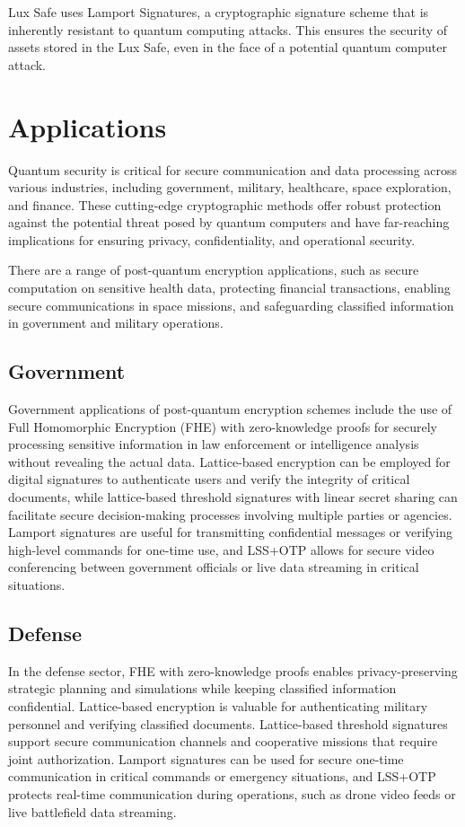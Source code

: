 \documentclass[11pt]{article}
\begin{document}
Lux Safe uses Lamport Signatures, a cryptographic signature scheme that is inherently resistant to quantum computing attacks. This ensures the security of assets stored in the Lux Safe, even in the face of a potential quantum computer attack.


\section{Applications}

Quantum security is critical for secure communication and data processing across various industries, including government, military, healthcare, space exploration, and finance. These cutting-edge cryptographic methods offer robust protection against the potential threat posed by quantum computers and have far-reaching implications for ensuring privacy, confidentiality, and operational security.


There are a range of post-quantum encryption applications, such as secure computation on sensitive health data, protecting financial transactions, enabling secure communications in space missions, and safeguarding classified information in government and military operations.


\subsection{Government}

Government applications of post-quantum encryption schemes include the use of Full Homomorphic Encryption (FHE) with zero-knowledge proofs for securely processing sensitive information in law enforcement or intelligence analysis without revealing the actual data. Lattice-based encryption can be employed for digital signatures to authenticate users and verify the integrity of critical documents, while lattice-based threshold signatures with linear secret sharing can facilitate secure decision-making processes involving multiple parties or agencies. Lamport signatures are useful for transmitting confidential messages or verifying high-level commands for one-time use, and LSS+OTP allows for secure video conferencing between government officials or live data streaming in critical situations.


\subsection{Defense}

In the defense sector, FHE with zero-knowledge proofs enables privacy-preserving strategic planning and simulations while keeping classified information confidential. Lattice-based encryption is valuable for authenticating military personnel and verifying classified documents. Lattice-based threshold signatures support secure communication channels and cooperative missions that require joint authorization. Lamport signatures can be used for secure one-time communication in critical commands or emergency situations, and LSS+OTP protects real-time communication during operations, such as drone video feeds or live battlefield data streaming.
\end{document}

